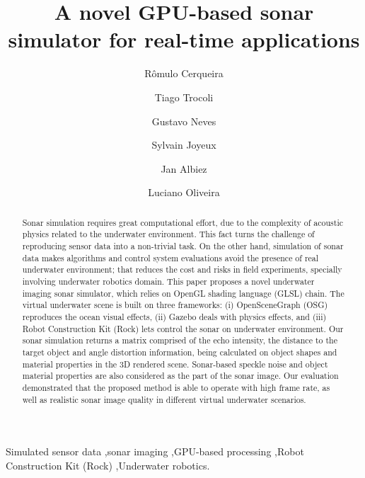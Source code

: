 \documentclass[final,5p,times]{elsarticle}
\begin{document}
\begin{frontmatter}


\title{A novel GPU-based sonar simulator for real-time applications}

\author[senai,ufba]{Rômulo Cerqueira} 
\author[senai]{Tiago Trocoli}
\author[senai]{Gustavo Neves}
\author[senai]{Sylvain Joyeux}
\author[senai,dfki]{Jan Albiez}
\author[ufba]{Luciano Oliveira}

\address[senai]{Brazilian Institute of Robotics, SENAI CIMATEC, Salvador, Bahia, Brazil}
\address[ufba]{Intelligent Vision Research Lab, Federal University of Bahia, Salvador, Bahia, Brazil}
\address[dfki]{Robotics Innovation Center, DFKI GmbH, Bremen, Germany}

\begin{abstract}

Sonar simulation requires great computational effort, due to the complexity of acoustic physics related to the underwater environment. This fact turns the challenge of reproducing sensor data into a non-trivial task. On the other hand, simulation of sonar data makes algorithms and control system evaluations avoid the presence of real underwater environment; that reduces the cost and risks in field experiments, specially involving underwater robotics domain. This paper proposes a novel underwater imaging sonar simulator, which relies on OpenGL shading language (GLSL) chain. The virtual underwater scene is built on three frameworks: (i) OpenSceneGraph (OSG) reproduces the ocean visual effects, (ii) Gazebo deals with physics effects, and (iii) Robot Construction Kit (Rock) lets control the sonar on underwater environment. Our sonar simulation returns a matrix comprised of the echo intensity, the distance to the target object and angle distortion information, being calculated on object shapes and material properties in the 3D rendered scene. Sonar-based speckle noise and object material properties are also considered as the part of the sonar image. Our evaluation demonstrated that the proposed method is able to operate with high frame rate, as well as realistic sonar image quality in different virtual underwater scenarios.

\end{abstract}

\begin{keyword}
Simulated sensor data \sep sonar imaging  \sep GPU-based processing \sep Robot Construction Kit (Rock) \sep Underwater robotics.

\end{keyword}

\end{frontmatter}
\end{document}
